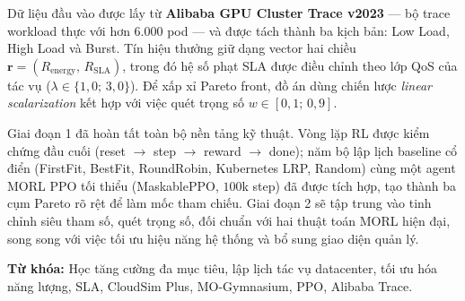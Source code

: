 \bigskip
\noindent
Dữ liệu đầu vào được lấy từ \textbf{Alibaba GPU Cluster Trace v2023} --- bộ
trace workload thực với hơn 6.000 pod --- và được tách thành ba kịch bản:
Low Load, High Load và Burst. Tín hiệu thưởng giữ dạng vector hai chiều
$\mathbf{r} = (R_\text{energy},\, R_\text{SLA})$, trong đó hệ số phạt SLA được
điều chỉnh theo lớp QoS của tác vụ ($\lambda \in \{1{,}0;\, 3{,}0\}$). Để
xấp xỉ Pareto front, đồ án dùng chiến lược \textit{linear scalarization} kết
hợp với việc quét trọng số $w \in [0{,}1;\, 0{,}9]$.

\bigskip
\noindent
Giai đoạn 1 đã hoàn tất toàn bộ nền tảng kỹ thuật. Vòng lặp RL được kiểm
chứng đầu cuối (reset $\to$ step $\to$ reward $\to$ done); năm bộ lập lịch
baseline cổ điển (FirstFit, BestFit, RoundRobin, Kubernetes LRP, Random) cùng
một agent MORL PPO tối thiểu (MaskablePPO, $100$k step) đã được tích hợp,
tạo thành ba cụm Pareto rõ rệt để làm mốc tham chiếu. Giai đoạn 2 sẽ tập
trung vào tinh chỉnh siêu tham số, quét trọng số, đối chuẩn với hai thuật
toán MORL hiện đại, song song với việc tối ưu hiệu năng hệ thống và bổ sung
giao diện quản lý.

\bigskip
\noindent
\textbf{Từ khóa:} Học tăng cường đa mục tiêu, lập lịch tác vụ datacenter, tối ưu hóa
năng lượng, SLA, CloudSim Plus, MO-Gymnasium, PPO, Alibaba Trace.

\newpage






